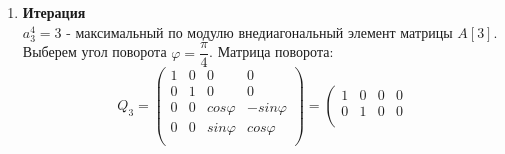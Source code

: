\documentclass[12pt]{article}
\begin{document}
\begin{enumerate}[label=\textbf{\arabic*}]
\begin{equation*}
\begin{array}{cccc}
		0 & 0 & 1 & 0 \\
		0 & 0 & 0 & 1 \\
	\end{array}
	\right)
	=
	\left(
	\begin{array}{cccc}
		0.70711 & -0.7071 & 0 & 0 \\
		0.70711 & 0.70711 & 0 & 0 \\
		0 & 0 & 1 & 0 \\
		0 & 0 & 0 & 1 \\
	\end{array}
	\right)
\end{equation*}
\begin{equation*}
	{}^T Q_2 = \left(
	\begin{array}{cccc}
		0.70711 & 0.70711 & 0 & 0 \\
		-0.7071 & 0.70711 & 0 & 0 \\
		0 & 0 & 1 & 0 \\
		0 & 0 & 0 & 1 \\
	\end{array}
	\right)
\end{equation*}
\begin{equation*}
	A[3] = {}^T Q_2 \cdot A[2] \cdot Q_2 = \left(
	\begin{array}{cccc}
		17 & 0 & 0 & 0 \\
		0 & 11 & 0 & 0 \\
		0 & 0 & 8 & -1 \\
		0 & 0 & -1 & 8 \\
	\end{array}
	\right)
\end{equation*}
\item \textbf{Итерация} \\
$a_3^4=3$ - максимальный по модулю внедиагональный элемент матрицы $A[3]$. \\
Выберем угол поворота $\varphi = \dfrac\pi4$.
Матрица поворота:
\begin{equation*}
	Q_3 = \left(
	\begin{array}{cccc}
		1 & 0 & 0 & 0 \\
		0 & 1 & 0 & 0 \\
		0 & 0 & cos \varphi & -sin \varphi \\
		0 & 0 & sin \varphi & cos \varphi \\
	\end{array}
	\right)
	=
	\left(
	\begin{array}{cccc}
		1 & 0 & 0 & 0 \\
		0 & 1 & 0 & 0 \\

\end{array}
\end{equation*}
\end{enumerate}
\end{document}
